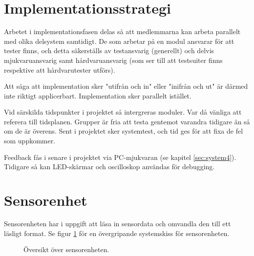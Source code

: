 \documentclass[a4paper,11pt]{article}
\begin{document}
\clearpage
\section{Implementationsstrategi}
Arbetet i implementationsfasen delas så att medlemmarna kan arbeta parallelt med olika delsystem samtidigt. De som arbetar på en modul ansvarar för att tester finns, och detta säkerställs av testansvarig (generellt) och delvis mjukvaruansvarig samt hårdvaruansvarig (som ser till att testsuiter finns respektive att hårdvarutester utförs).

Att säga att implementation sker "utifrån och in" eller "inifrån och ut" är därmed inte riktigt applicerbart. Implementation sker parallelt istället.

Vid särskilda tidspunkter i projektet så intergreras moduler. Var då vänliga att referera till tidsplanen. Grupper är fria att testa gentemot varandra tidigare än så om de är överens. Sent i projektet sker systemtest, och tid ges för att fixa de fel som uppkommer.

Feedback fås i senare i projektet via PC-mjukvaran (se kapitel \ref{sec:system4}). Tidigare så kan LED-skärmar och oscilloskop användas för debugging.


\clearpage
\section{Sensorenhet} \label{sec:system1}
Sensorenheten har i uppgift att läsa in sensordata och omvandla den till ett läsligt format. Se figur \ref{fig:unitSensor} för en övergripande systemskiss för sensorenheten.
\begin{figure}[h!]
    \caption{Översikt över sensorenheten.}
    \label{fig:unitSensor}
\end{figure}
\end{document}
